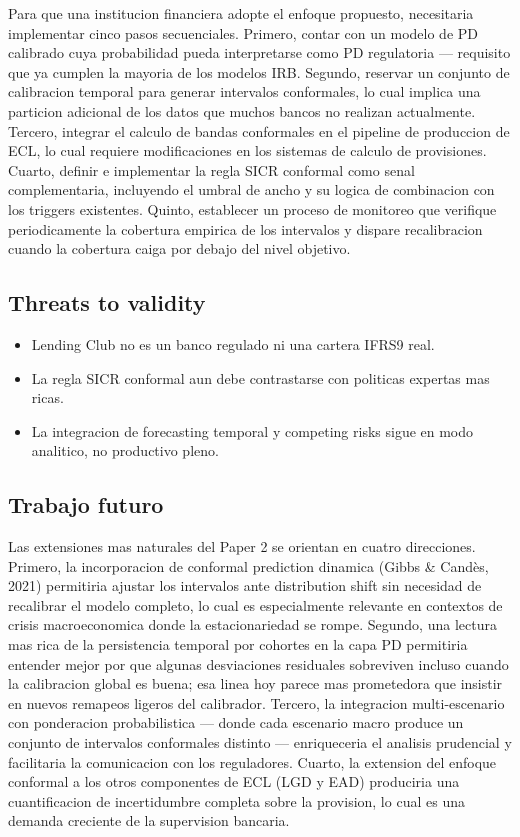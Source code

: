 \documentclass[
  spanish,
  11pt,
  letterpaper,
]{scrbook}
\providecommand{\tightlist}{%
  \setlength{\itemsep}{0pt}\setlength{\parskip}{0pt}}
\theoremstyle{plain}
\theoremstyle{remark}
\begin{document}
Para que una institucion financiera adopte el enfoque propuesto,
necesitaria implementar cinco pasos secuenciales. Primero, contar con un
modelo de PD calibrado cuya probabilidad pueda interpretarse como PD
regulatoria --- requisito que ya cumplen la mayoria de los modelos IRB.
Segundo, reservar un conjunto de calibracion temporal para generar
intervalos conformales, lo cual implica una particion adicional de los
datos que muchos bancos no realizan actualmente. Tercero, integrar el
calculo de bandas conformales en el pipeline de produccion de ECL, lo
cual requiere modificaciones en los sistemas de calculo de provisiones.
Cuarto, definir e implementar la regla SICR conformal como senal
complementaria, incluyendo el umbral de ancho y su logica de combinacion
con los triggers existentes. Quinto, establecer un proceso de monitoreo
que verifique periodicamente la cobertura empirica de los intervalos y
dispare recalibracion cuando la cobertura caiga por debajo del nivel
objetivo.

\subsection{Threats to validity}\label{threats-to-validity}

\begin{itemize}
\tightlist
\item
  Lending Club no es un banco regulado ni una cartera IFRS9 real.
\item
  La regla SICR conformal aun debe contrastarse con politicas expertas
  mas ricas.
\item
  La integracion de forecasting temporal y competing risks sigue en modo
  analitico, no productivo pleno.
\end{itemize}

\subsection{Trabajo futuro}\label{sec-p2-future}

Las extensiones mas naturales del Paper 2 se orientan en cuatro
direcciones. Primero, la incorporacion de conformal prediction dinamica
(Gibbs \& Candès, 2021) permitiria ajustar los intervalos ante
distribution shift sin necesidad de recalibrar el modelo completo, lo
cual es especialmente relevante en contextos de crisis macroeconomica
donde la estacionariedad se rompe. Segundo, una lectura mas rica de la
persistencia temporal por cohortes en la capa PD permitiria entender
mejor por que algunas desviaciones residuales sobreviven incluso cuando
la calibracion global es buena; esa linea hoy parece mas prometedora que
insistir en nuevos remapeos ligeros del calibrador. Tercero, la
integracion multi-escenario con ponderacion probabilistica --- donde
cada escenario macro produce un conjunto de intervalos conformales
distinto --- enriqueceria el analisis prudencial y facilitaria la
comunicacion con los reguladores. Cuarto, la extension del enfoque
conformal a los otros componentes de ECL (LGD y EAD) produciria una
cuantificacion de incertidumbre completa sobre la provision, lo cual es
una demanda creciente de la supervision bancaria.
\end{document}
